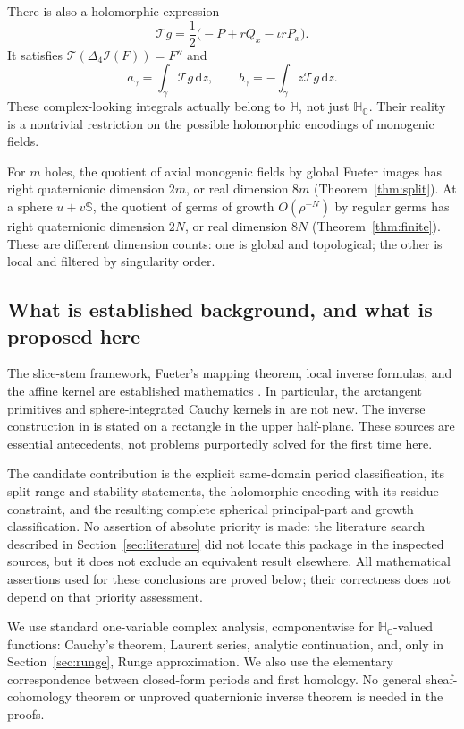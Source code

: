 \documentclass[11pt,a4paper]{article}
\numberwithin{equation}{section}
\theoremstyle{definition}
\theoremstyle{remark}
\newcommand{\C}{\mathbb C}
\newcommand{\HH}{\mathbb H}
\newcommand{\HC}{\mathbb H_{\C}}
\newcommand{\Sp}{\mathbb S}
\newcommand{\Lap}{\Delta_4}
\newcommand{\Ind}{\mathcal I}
\newcommand{\dd}{\,\mathrm d}
\newcommand{\T}{\mathcal T}
\begin{document}
There is also a holomorphic expression
\begin{equation}\label{eq:intro-T}
 \T g=\frac12\bigl(-P+rQ_x-\iota rP_x\bigr).
\end{equation}
It satisfies $\T(\Lap\Ind(F))=F''$ and
\begin{equation}\label{eq:intro-complexperiod}
 a_\gamma=\int_\gamma\T g\dd z,
 \qquad b_\gamma=-\int_\gamma z\T g\dd z.
\end{equation}
These complex-looking integrals actually belong to $\HH$, not just $\HC$.
Their reality is a nontrivial restriction on the possible holomorphic
encodings of monogenic fields.

For $m$ holes, the quotient of axial monogenic fields by global Fueter
images has right quaternionic dimension $2m$, or real dimension $8m$
(Theorem~\ref{thm:split}). At a sphere $u+v\Sp$, the quotient of germs of
growth $O(\rho^{-N})$ by regular germs has right quaternionic dimension
$2N$, or real dimension $8N$ (Theorem~\ref{thm:finite}). These are different
dimension counts: one is global and topological; the other is local and
filtered by singularity order.

\subsection{What is established background, and what is proposed here}
The slice-stem framework, Fueter's mapping theorem, local inverse formulas,
and the affine kernel are established mathematics
\cite{GS,GP,CSS,CPSS}. In particular, the arctangent primitives and
sphere-integrated Cauchy kernels in \cite[Theorem 5.1]{CSS} are not new.
The inverse construction in \cite[Theorem 3]{CPSS} is stated on a rectangle
in the upper half-plane. These sources are essential antecedents, not
problems purportedly solved for the first time here.

The candidate contribution is the explicit same-domain period
classification, its split range and stability statements, the holomorphic
encoding with its residue constraint, and the resulting complete
spherical principal-part and growth classification. No assertion of
absolute priority is made: the literature search described in
Section~\ref{sec:literature} did not locate this package in the inspected
sources, but it does not exclude an equivalent result elsewhere.
All mathematical assertions used for these conclusions are proved below;
their correctness does not depend on that priority assessment.

We use standard one-variable complex analysis, componentwise for
$\HC$-valued functions: Cauchy's theorem, Laurent series, analytic
continuation, and, only in Section~\ref{sec:runge}, Runge approximation.
We also use the elementary correspondence between closed-form periods
and first homology. No general sheaf-cohomology theorem or unproved
quaternionic inverse theorem is needed in the proofs.
\end{document}
